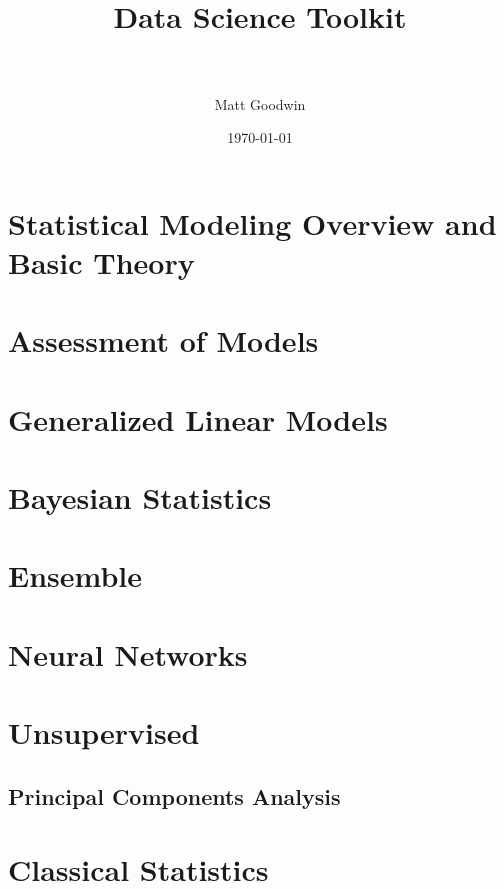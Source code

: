 \documentclass[paper=a4, fontsize=11pt]{scrartcl} %
\title{	
\normalfont \normalsize 
\horrule{0.5pt} \\[0.4cm] %
\huge Data Science Toolkit \\ %
\horrule{2pt} \\[0.5cm] %
}
\author{Matt Goodwin} %
\date{\normalsize\today} %
\numberwithin{equation}{section} %
\numberwithin{figure}{section} %
\numberwithin{table}{section} %
\begin{document}
\maketitle 

\tableofcontents
\newpage


\section{Statistical Modeling Overview and Basic Theory}


\section{Assessment of Models}


\section{Generalized Linear Models}


\section{Bayesian Statistics}


\section{Ensemble}


\section{Neural Networks}


\section{Unsupervised}
\subsection{Principal Components Analysis}

\section{Classical Statistics}

\end{document}
